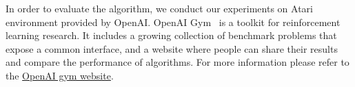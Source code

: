 
In order to evaluate the algorithm, we conduct our experiments on Atari environment
provided by OpenAI. OpenAI Gym~\cite{brockman2016openai} is a toolkit for reinforcement learning
research. It includes a growing collection of benchmark problems that expose a
common interface, and a website where people can share their results and
compare the performance of algorithms.
For more information please refer to the \href{https://gym.openai.com/}{OpenAI gym website}.

